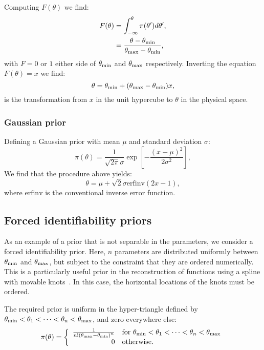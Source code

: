Computing $F(\theta)$ we find:
\begin{align}
  F(\theta) &= \int_{-\infty}^\theta \pi(\theta')d\theta', \nonumber\\
  &= \frac{\theta-\theta_{\mathrm{min}}}{\theta_{\mathrm{max}}-\theta_{\mathrm{min}}},
  \label{eqn:pc:calc_uniform_trans}
\end{align}
with $F=0$ or $1$ either side of $\theta_{\mathrm{min}}$ and $\theta_{\mathrm{max}}$ respectively. Inverting the equation $F(\theta)=x$ we find:
\begin{equation}
  \theta = \theta_{\mathrm{min}}+(\theta_{\mathrm{max}}-\theta_{\mathrm{min}})x,
  \label{eqn:pc:uniform_trans}                           
\end{equation}
is the transformation from $x$ in the unit hypercube to $\theta$ in the physical space.

\subsubsection{Gaussian prior}
\label{sec:pc:gaussian_prior}
Defining a Gaussian prior with mean $\mu$ and standard deviation $\sigma$:
\begin{equation}
  \pi(\theta) = \frac{1}{\sqrt{2\pi}\sigma}\exp{\left[-\frac{{(x-\mu)}^2}{2\sigma^2}\right]},
  \label{eqn:pc:gaussian_prior}
\end{equation}
We find that the procedure above yields:
\begin{equation}
  \theta = \mu + \sqrt{2}\sigma\text{erfinv}(2x-1),
  \label{eqn:pc:gaussian_trans}                           
\end{equation}
where $\text{erfinv}$ is the conventional inverse error function.




\subsection{Forced identifiability priors}
\label{sec:pc:forced_identifiablility}

As an example of a prior that is not separable in the parameters, we consider a forced identifiability prior. Here, $n$ parameters are distributed uniformly between $\theta_{\mathrm{min}}$ and $\theta_{\mathrm{max}}$, but subject to the constraint that they are ordered numerically. This is a particularly useful prior in the reconstruction of functions using a spline with movable knots~\citep{vazquez_knots,knottedsky1,knottedsky2,planck2015-a24}. In this case, the  horizontal locations of the knots must be ordered.

The required prior is uniform in the hyper-triangle defined by $\theta_{\mathrm{min}}<\theta_1<\cdots<\theta_n<\theta_{\mathrm{max}}$, and zero everywhere else:
%
\begin{equation}
  \pi(\theta) = 
  \left\{
    \begin{array}{rl}
      \frac{1}{n!{(\theta_{\mathrm{max}} - \theta_{\mathrm{min}})}^{n}} 
      &
      \text{for }\theta_{\mathrm{min}}<\theta_1<\cdots<\theta_n<\theta_{\mathrm{max}} \\
      0 &\text{otherwise.}
    \end{array}
    \right.
\label{eqn:pc:sorted_uniform_prior}
\end{equation}

